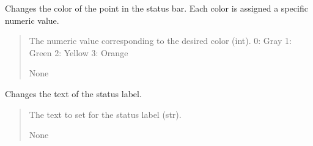 \documentclass[letterpaper,10pt,english]{sphinxmanual}
\begin{document}
\begin{fulllineitems}
\begin{fulllineitems}
\end{fulllineitems}


\begin{fulllineitems}
\label{\detokenize{FLIMGraphics:FLIMGraphics.FLIMGraphic.changeStatusColor}}
\pysigstartsignatures
{}
\pysigstopsignatures
\sphinxAtStartPar
Changes the color of the point in the status bar. Each color is assigned a specific numeric value.
\begin{quote}\begin{description}
\sphinxAtStartPar
{} \textendash{} The numeric value corresponding to the desired color (int).
\sphinxhyphen{} 0: Gray
\sphinxhyphen{} 1: Green
\sphinxhyphen{} 2: Yellow
\sphinxhyphen{} 3: Orange

\sphinxAtStartPar
None

\end{description}\end{quote}

\end{fulllineitems}


\begin{fulllineitems}
\label{\detokenize{FLIMGraphics:FLIMGraphics.FLIMGraphic.changeStatusLabel}}
\pysigstartsignatures
{}
\pysigstopsignatures
\sphinxAtStartPar
Changes the text of the status label.
\begin{quote}\begin{description}
\sphinxAtStartPar
{} \textendash{} The text to set for the status label (str).

\sphinxAtStartPar
None

\end{description}\end{quote}

\end{fulllineitems}


\end{fulllineitems}
\end{document}
